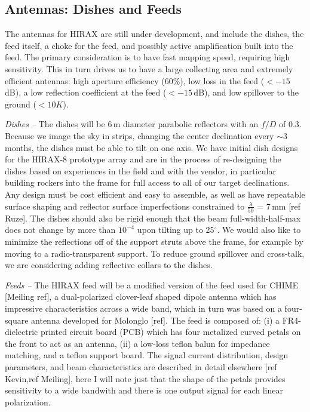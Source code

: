 \documentclass[]{spie}  %
\begin{document}
\subsection{Antennas: Dishes and Feeds}

The antennas for HIRAX are still under development, and include the dishes, the feed itself, a choke for the feed, and possibly active amplification built into the feed. The primary consideration is to have fast mapping speed, requiring high sensitivity. This in turn drives us to have a large collecting area and extremely efficient antennas: high aperture efficiency (60\%), low loss in the feed ($<-15$\,dB), a low reflection coefficient at the feed ($<-15$\,dB), and low spillover to the ground ($<10K$). \newline

\textit{Dishes --} The dishes will be 6\,m diameter parabolic reflectors with an $f/D$ of 0.3. Because we image the sky in strips, changing the center declination every $\sim$3\,months, the dishes must be able to tilt on one axis. We have initial dish designs for the HIRAX-8 prototype array and are in the process of re-designing the dishes based on experiences in the field and with the vendor, in particular building rockers into the frame for full access to all of our target declinations. Any design must be cost efficient and easy to assemble, as well as have repeatable surface shaping and reflector surface imperfections constrained to $\frac{\lambda}{50}$ = 7\,mm [ref Ruze]. The dishes should also be rigid enough that the beam full-width-half-max does not change by more than $10^{-4}$ upon tilting up to 25$^{\circ}$. We would also like to minimize the reflections off of the support struts above the frame, for example by moving to a radio-transparent support. To reduce ground spillover and cross-talk, we are considering adding reflective collars to the dishes. \newline

\textit{Feeds -- } The HIRAX feed will be a modified version of the feed used for CHIME [Meiling ref], a dual-polarized clover-leaf shaped dipole antenna which has impressive characteristics across a wide band, which in turn was based on a four-square antenna developed for Molonglo [ref]. The feed is composed of: (i) a FR4-dielectric printed circuit board (PCB) which has four metalized curved petals on the front to act as an antenna, (ii) a low-loss teflon balun for impedance matching, and a teflon support board. The signal current distribution, design parameters, and beam characteristics are described in detail elsewhere [ref Kevin,ref Meiling], here I will note just that the shape of the petals provides sensitivity to a wide bandwith and there is one output signal for each linear polarization. \newline
\end{document}

